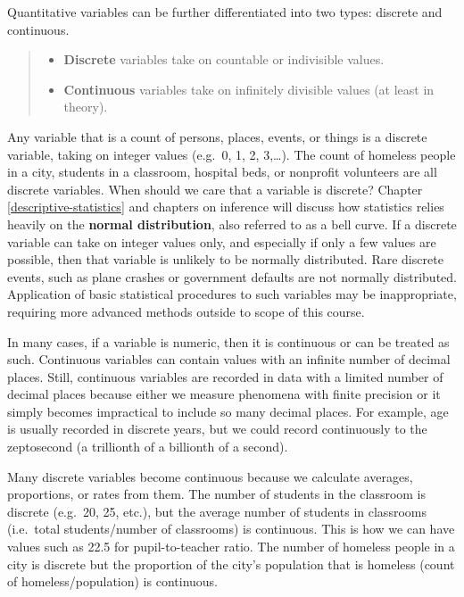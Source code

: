 \documentclass[
]{book}
\providecommand{\tightlist}{%
  \setlength{\itemsep}{0pt}\setlength{\parskip}{0pt}}
\begin{document}
Quantitative variables can be further differentiated into two types: discrete and continuous.

\begin{quote}
\begin{itemize}
\tightlist
\item
  \textbf{Discrete} variables take on countable or indivisible values.
\item
  \textbf{Continuous} variables take on infinitely divisible values (at least in theory).
\end{itemize}
\end{quote}

Any variable that is a count of persons, places, events, or things is a discrete variable, taking on integer values (e.g.~0, 1, 2, 3,\ldots). The count of homeless people in a city, students in a classroom, hospital beds, or nonprofit volunteers are all discrete variables. When should we care that a variable is discrete? Chapter \ref{descriptive-statistics} and chapters on inference will discuss how statistics relies heavily on the \textbf{normal distribution}, also referred to as a bell curve. If a discrete variable can take on integer values only, and especially if only a few values are possible, then that variable is unlikely to be normally distributed. Rare discrete events, such as plane crashes or government defaults are not normally distributed. Application of basic statistical procedures to such variables may be inappropriate, requiring more advanced methods outside to scope of this course.

In many cases, if a variable is numeric, then it is continuous or can be treated as such. Continuous variables can contain values with an infinite number of decimal places. Still, continuous variables are recorded in data with a limited number of decimal places because either we measure phenomena with finite precision or it simply becomes impractical to include so many decimal places. For example, age is usually recorded in discrete years, but we could record continuously to the zeptosecond (a trillionth of a billionth of a second).

Many discrete variables become continuous because we calculate averages, proportions, or rates from them. The number of students in the classroom is discrete (e.g.~20, 25, etc.), but the average number of students in classrooms (i.e.~total students/number of classrooms) is continuous. This is how we can have values such as 22.5 for pupil-to-teacher ratio. The number of homeless people in a city is discrete but the proportion of the city's population that is homeless (count of homeless/population) is continuous.
\end{document}
